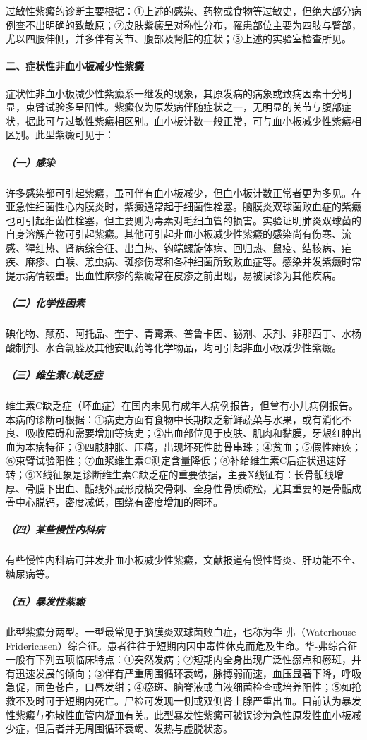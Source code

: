 过敏性紫癜的诊断主要根据：①上述的感染、药物或食物等过敏史，但绝大部分病例查不出明确的致敏原；②皮肤紫癜呈对称性分布，罹患部位主要为四肢与臂部，尤以四肢伸侧，并多伴有关节、腹部及肾脏的症状；③上述的实验室检查所见。

\paragraph{二、症状性非血小板减少性紫癜}

症状性非血小板减少性紫癜系一继发的现象，其原发病的病象或致病因素十分明显，束臂试验多呈阳性。紫癜仅为原发病伴随症状之一，无明显的关节与腹部症状，据此可与过敏性紫癜相区别。血小板计数一般正常，可与血小板减少性紫癜相区别。此型紫癜可见于：

\subparagraph{（一）感染}

许多感染都可引起紫癜，虽可伴有血小板减少，但血小板计数正常者更为多见。在亚急性细菌性心内膜炎时，紫癜通常起于细菌性栓塞。脑膜炎双球菌败血症的紫癜也可引起细菌性栓塞，但主要则为毒素对毛细血管的损害。实验证明肺炎双球菌的自身溶解产物可引起紫癜。其他可引起非血小板减少性紫癜的感染尚有伤寒、流感、猩红热、肾病综合征、出血热、钩端螺旋体病、回归热、鼠疫、结核病、疟疾、麻疹、白喉、恙虫病、斑疹伤寒和各种细菌所致败血症等。感染并发紫癜时常提示病情较重。出血性麻疹的紫癜常在皮疹之前出现，易被误诊为其他疾病。

\subparagraph{（二）化学性因素}

碘化物、颠茄、阿托品、奎宁、青霉素、普鲁卡因、铋剂、汞剂、非那西丁、水杨酸制剂、水合氯醛及其他安眠药等化学物品，均可引起非血小板减少性紫癜。

\subparagraph{（三）维生素C缺乏症}

维生素C缺乏症（坏血症）在国内未见有成年人病例报告，但曾有小儿病例报告。本病的诊断可根据：①病史方面有食物中长期缺乏新鲜蔬菜与水果，或有消化不良、吸收障碍和需要增加等病史；②出血部位见于皮肤、肌肉和黏膜，牙龈红肿出血为本病特征；③四肢肿胀、压痛，出现坏死性肋骨串珠；④贫血；⑤假性瘫痪；⑥束臂试验阳性；⑦血浆维生素C测定含量降低；⑧补给维生素C后症状迅速好转；⑨X线征象是诊断维生素C缺乏症的重要依据，主要X线征有：长骨骺线增厚、骨膜下出血、骺线外展形成横突骨刺、全身性骨质疏松，尤其重要的是骨骺成骨中心脱钙，密度减低，围绕有密度增加的圈环。

\subparagraph{（四）某些慢性内科病}

有些慢性内科病可并发非血小板减少性紫癜，文献报道有慢性肾炎、肝功能不全、糖尿病等。

\subparagraph{（五）暴发性紫癜}

此型紫癜分两型。一型最常见于脑膜炎双球菌败血症，也称为华-弗（Waterhouse-Friderichsen）综合征。患者往往于短期内因中毒性休克而危及生命。华-弗综合征一般有下列五项临床特点：①突然发病；②短期内全身出现广泛性瘀点和瘀斑，并有迅速发展的倾向；③伴有严重周围循环衰竭，脉搏弱而速，血压显著下降，呼吸急促，面色苍白，口唇发绀；④瘀斑、脑脊液或血液细菌检查或培养阳性；⑤如抢救不及时可于短期内死亡。尸检可发现一侧或双侧肾上腺严重出血。目前认为暴发性紫癜与弥散性血管内凝血有关。此型暴发性紫癜可被误诊为急性原发性血小板减少症，但后者并无周围循环衰竭、发热与虚脱状态。

